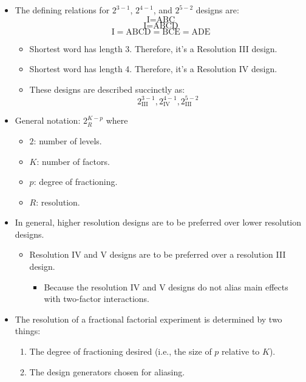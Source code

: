 \begin{itemize}[*]
    \item The defining relations for $ 2^{3-1} $, $ 2^{4-1} $, and $ 2^{5-2} $ designs are:
          \[ \text{I}=\text{ABC} \]
          \[ \text{I}=\text{ABCD} \]
          \[ \text{I}=\text{ABCD}=\text{BCE}=\text{ADE} \]
          \begin{itemize}[label={}]
              \item Shortest word has length 3. Therefore, it's a Resolution III design.
              \item Shortest word has length 4. Therefore, it's a Resolution IV design.
              \item These designs are described succinctly as:
                    \[ 2^{3-1}_{\text{III}},2^{4-1}_{\text{IV}},2^{5-2}_{\text{III}} \]
          \end{itemize}
    \item General notation: $ 2_R^{K-p} $ where
          \begin{itemize}
              \item $ 2 $: number of levels.
              \item $ K $: number of factors.
              \item $ p $: degree of fractioning.
              \item $ R $: resolution.
          \end{itemize}
\end{itemize}
\begin{itemize}[*]
    \item In general, higher resolution designs are to be preferred over lower resolution designs.
          \begin{itemize}
              \item Resolution IV and V designs are to be preferred over a resolution III design.
                    \begin{itemize}[$\hookrightarrow$]
                        \item Because the resolution IV and V designs do not alias main effects with two-factor interactions.
                    \end{itemize}
          \end{itemize}
\end{itemize}
\begin{itemize}
    \item The resolution of a fractional factorial experiment is determined by two things:
          \begin{enumerate}[1.]
              \item The degree of fractioning desired (i.e., the size of $p$ relative to $K$).
              \item The design generators chosen for aliasing.
          \end{enumerate}
\end{itemize}
